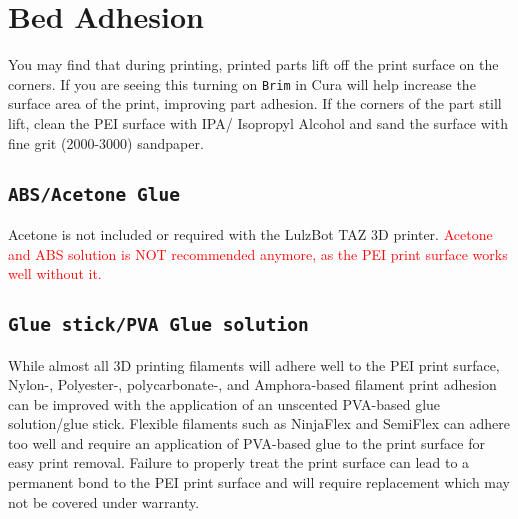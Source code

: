 
\section{Bed Adhesion}
You may find that during printing, printed parts lift off the print surface on the corners. If you are seeing this turning on \texttt{Brim} in Cura will help increase the surface area of the print, improving part adhesion. If the corners of the part still lift, clean the PEI surface with IPA/ Isopropyl Alcohol and sand the surface with fine grit (2000-3000) sandpaper. 


\subsection{\texttt{ABS/Acetone Glue}}
\label{sec:ABS/Acetone Glue}

Acetone is not included or required with the LulzBot TAZ 3D printer. \textcolor{red}{Acetone and ABS solution is NOT recommended anymore, as the PEI print surface works well without it.}

\subsection{\texttt{Glue stick/PVA Glue solution}}
\label{sec:Glue stick/PVA Glue solution}
While almost all 3D printing filaments will adhere well to the PEI print surface, Nylon-, Polyester-, polycarbonate-, and Amphora\textsuperscript{\miniscule{\texttrademark}}-based filament print adhesion can be improved with the application of an unscented PVA-based glue solution/glue stick. Flexible filaments such as NinjaFlex\textsuperscript{\miniscule{\textregistered}} and SemiFlex\textsuperscript{\miniscule{\texttrademark}} can adhere too well and require an application of PVA-based glue to the print surface for easy print removal. Failure to properly treat the print surface can lead to a permanent bond to the PEI print surface and will require replacement which may not be covered under warranty.

